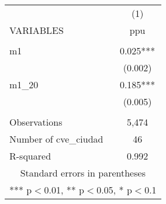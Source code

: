 \begin{tabular}{lc} \hline
 & (1) \\
VARIABLES & ppu \\ \hline
 &  \\
m1 & 0.025*** \\
 & (0.002) \\
m1\_20 & 0.185*** \\
 & (0.005) \\
 &  \\
Observations & 5,474 \\
Number of cve\_ciudad & 46 \\
 R-squared & 0.992 \\ \hline
\multicolumn{2}{c}{ Standard errors in parentheses} \\
\multicolumn{2}{c}{ *** p$<$0.01, ** p$<$0.05, * p$<$0.1} \\
\end{tabular}
